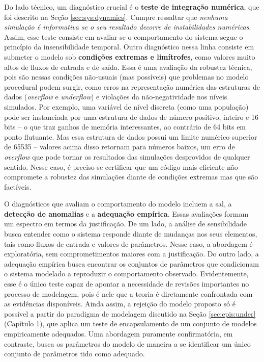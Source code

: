 \documentclass[./main.tex]{subfiles}
\begin{document}
\par Do lado técnico, um diagnóstico crucial é o \textbf{teste de integração numérica}, que foi descrito na Seção \ref{sec:sys:dynamics}. Cumpre ressaltar que \textit{nenhuma simulação é informativa se o seu resultado decorre de instabilidades numéricas}. Assim, esse teste consiste em avaliar se o comportamento do sistema segue o princípio da insensibilidade temporal. Outro diagnóstico nessa linha consiste em submeter o modelo sob \textbf{condições extremas e limítrofes}, como valores muito altos de fluxos de entrada e de saída. Essa é uma avaliação da robustez técnica, pois são nessas condições não-usuais (mas possíveis) que problemas no modelo procedural podem surgir, como erros na representação numérica das estruturas de dados (\textit{overflow} e \textit{underflow}) e violações da não-negatividade nos níveis simulados. Por exemplo, uma variável de nível discreta (como uma população) pode ser instanciada por uma estrutura de dados de número positivo, inteiro e 16 bits -- o que traz ganhos de memória interessantes, ao contrário de 64 bits em ponto flutuante. Mas essa estrutura de dados possui um limite numérico superior de 65535 -- valores acima disso retornam para números baixos, um erro de \textit{overflow} que pode tornar os resultados das simulações desprovidos de qualquer sentido. Nesse caso, é preciso se certificar que um código mais eficiente não compromete a robustez das simulações diante de condições extremas mas que são factíveis.

\par O diagnósticos que avaliam o comportamento do modelo incluem a \gls{sal}, a \textbf{detecção de anomalias} e a \textbf{adequação empírica}. Essas avaliações formam um espectro em termos da justificação. De um lado, a análise de sensibilidade busca entender como o sistema responde diante de mudanças nos seus elementos, tais como fluxos de entrada e valores de parâmetros. Nesse caso, a abordagem é exploratória, sem comprometimentos maiores com a justificação. Do outro lado, a adequação empírica busca encontrar os conjuntos de parâmetros que condicionam o sistema modelado a reproduzir o comportamento observado. Evidentemente, esse é o único teste capaz de apontar a necessidade de revisões importantes no processo de modelagem, pois é nele que a teoria é diretamente confrontada com as evidências disponíveis. Ainda assim, a rejeição do modelo proposto só é possível a partir do paradigma de modelagem discutido na Seção \ref{sec:epis:under} (Capítulo 1), que aplica um teste de encapsulamento de um conjunto de modelos empiricamente adequados. Uma abordagem puramente confirmatória, em contraste, busca  os parâmetros do modelo de maneira a se identificar um único conjunto de parâmetros tido como adequado.
\end{document}
